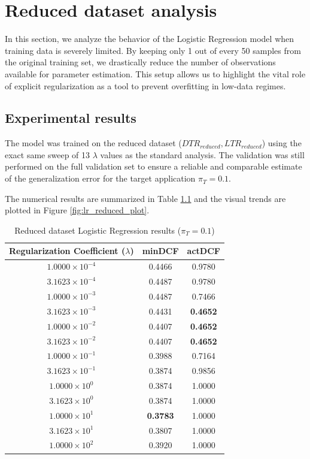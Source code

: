 \chapter{Reduced dataset analysis}

In this section, we analyze the behavior of the Logistic Regression model when training data is severely limited. By keeping only 1 out of every 50 samples from the original training set, we drastically reduce the number of observations available for parameter estimation. This setup allows us to highlight the vital role of explicit regularization as a tool to prevent overfitting in low-data regimes.

\section{Experimental results}

The model was trained on the reduced dataset ($DTR_{reduced}, LTR_{reduced}$) using the exact same sweep of 13 $\lambda$ values as the standard analysis. The validation was still performed on the full validation set to ensure a reliable and comparable estimate of the generalization error for the target application $\pi_T = 0.1$.

The numerical results are summarized in Table \ref{tab:red_lr_results} and the visual trends are plotted in Figure \ref{fig:lr_reduced_plot}.

\begin{table}[h]
\centering
\caption{Reduced dataset Logistic Regression results ($\pi_T = 0.1$)}
\label{tab:red_lr_results}
\begin{tabular}{@{}ccc@{}}
\toprule
\textbf{Regularization Coefficient ($\lambda$)} & \textbf{minDCF} & \textbf{actDCF} \\ \midrule
$1.0000 \times 10^{-4}$ & 0.4466 & 0.9780 \\
$3.1623 \times 10^{-4}$ & 0.4487 & 0.9780 \\
$1.0000 \times 10^{-3}$ & 0.4487 & 0.7466 \\
$3.1623 \times 10^{-3}$ & 0.4431 & \textbf{0.4652} \\
$1.0000 \times 10^{-2}$ & 0.4407 & \textbf{0.4652} \\
$3.1623 \times 10^{-2}$ & 0.4407 & \textbf{0.4652} \\
$1.0000 \times 10^{-1}$ & 0.3988 & 0.7164 \\
$3.1623 \times 10^{-1}$ & 0.3874 & 0.9856 \\
$1.0000 \times 10^{0}$  & 0.3874 & 1.0000 \\
$3.1623 \times 10^{0}$  & 0.3874 & 1.0000 \\
$1.0000 \times 10^{1}$  & \textbf{0.3783} & 1.0000 \\
$3.1623 \times 10^{1}$  & 0.3807 & 1.0000 \\
$1.0000 \times 10^{2}$  & 0.3920 & 1.0000 \\
\bottomrule
\end{tabular}
\end{table}


